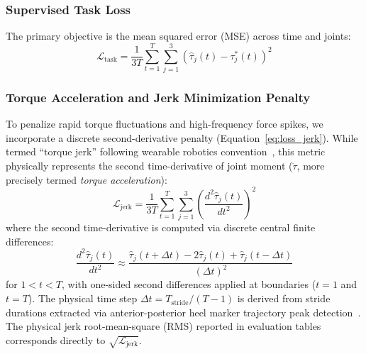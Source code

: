 \documentclass[journal]{IEEEtran}
\begin{document}
\subsubsection{Supervised Task Loss}
The primary objective is the mean squared error (MSE) across time and joints:
\begin{equation}
    \mathcal{L}_{\mathrm{task}} = \frac{1}{3T} \sum_{t=1}^{T} \sum_{j=1}^{3} \left( \hat{\tau}_j(t) - \tau_j^*(t) \right)^2
    \label{eq:loss_task}
\end{equation}

\subsubsection{Torque Acceleration and Jerk Minimization Penalty}
To penalize rapid torque fluctuations and high-frequency force spikes, we incorporate a discrete second-derivative penalty (Equation~\ref{eq:loss_jerk}). While termed ``torque jerk'' following wearable robotics convention~\cite{baud2021review}, this metric physically represents the second time-derivative of joint moment ($\ddot{\tau}$, more precisely termed \emph{torque acceleration}):
\begin{equation}
    \mathcal{L}_{\mathrm{jerk}} = \frac{1}{3T} \sum_{t=1}^{T} \sum_{j=1}^{3} \left( \frac{d^2 \hat{\tau}_j(t)}{dt^2} \right)^2
    \label{eq:loss_jerk}
\end{equation}
where the second time-derivative is computed via discrete central finite differences:
\begin{equation}
    \frac{d^2 \hat{\tau}_j(t)}{dt^2} \approx \frac{\hat{\tau}_j(t+\Delta t) - 2\hat{\tau}_j(t) + \hat{\tau}_j(t-\Delta t)}{(\Delta t)^2}
    \label{eq:finite_diff}
\end{equation}
for $1 < t < T$, with one-sided second differences applied at boundaries ($t=1$ and $t=T$). The physical time step $\Delta t = T_{\mathrm{stride}} / (T - 1)$ is derived from stride durations extracted via anterior-posterior heel marker trajectory peak detection~\cite{zeni2008two}. The physical jerk root-mean-square (RMS) reported in evaluation tables corresponds directly to $\sqrt{\mathcal{L}_{\mathrm{jerk}}}$.
\end{document}
